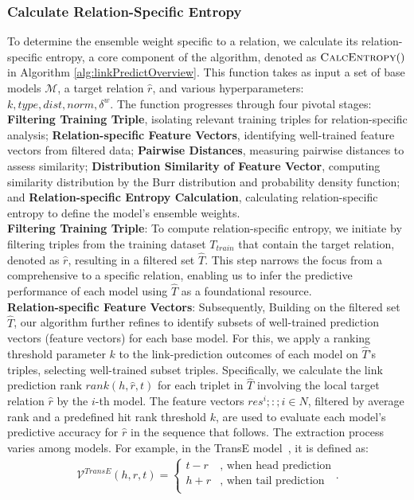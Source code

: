 \documentclass{article}
\begin{document}
\subsubsection{Calculate Relation-Specific Entropy}
To determine the ensemble weight specific to a relation, we calculate its relation-specific entropy, a core component of the algorithm, denoted as $\Call{CalcEntropy}$ in Algorithm \ref{alg:linkPredictOverview}. This function takes as input a set of base models $\mathcal{M}$, a target relation $\hat{r}$, and various hyperparameters: $k, type, dist, norm, \delta^w$. The function progresses through four pivotal stages: \textbf{Filtering Training Triple}, isolating relevant training triples for relation-specific analysis; \textbf{Relation-specific Feature Vectors}, identifying well-trained feature vectors from filtered data; \textbf{Pairwise Distances}, measuring pairwise distances to assess similarity; \textbf{Distribution Similarity of Feature Vector}, computing similarity distribution by the Burr distribution and probability density function; and \textbf{Relation-specific Entropy Calculation}, calculating relation-specific entropy to define the model's ensemble weights.
\\
\textbf{Filtering Training Triple}: To compute relation-specific entropy, we initiate by filtering triples from the training dataset $T_{train}$ that contain the target relation, denoted as $\hat{r}$, resulting in a filtered set $\hat{T}$. This step narrows the focus from a comprehensive to a specific relation, enabling us to infer the predictive performance of each model using $\hat{T}$ as a foundational resource. 
\\
\textbf{Relation-specific Feature Vectors}: Subsequently, Building on the filtered set $\hat{T}$, our algorithm further refines to identify subsets of well-trained prediction vectors (feature vectors) for each base model. For this, we apply a ranking threshold parameter $k$ to the link-prediction outcomes of each model on $\hat{T}$'s triples, selecting well-trained subset triples. Specifically, we calculate the link prediction rank $rank(h, \hat{r}, t)$ for each triplet in $\hat{T}$ involving the local target relation $\hat{r}$ by the $i$-th model. The feature vectors ${res^i ;:; i \in N}$, filtered by average rank and a predefined hit rank threshold $k$, are used to evaluate each model’s predictive accuracy for $\hat{r}$ in the sequence that follows. The extraction process varies among models. For example, in the TransE model~\cite{bordes2013translating}, it is defined as:
\begin{align}
\label{eq:PreV}
    \mathcal{V}^{TransE}(h, r, t) = \begin{cases}
            t-r & \text{, when head prediction} \\
            h+r & \text{, when tail prediction} \\
        \end{cases}.
\end{align}%
\end{document}
